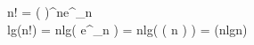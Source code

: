 \because n! = \left (  \right )^{n}e^{\alpha _{n}} \\
\therefore lg(n!) = nlg\left ( \cdot {} \cdot e^{\alpha_{n}}  \right) = nlg\left ( \Theta \left ( n \right ) \right ) = \Theta (nlgn)
